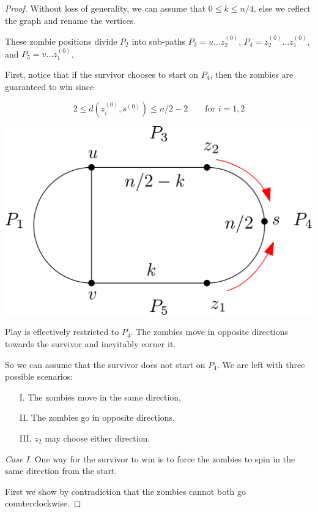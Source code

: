 \documentclass[letterpaper, 10pt]{article}
\begin{document}
\begin{proof}
Without loss of generality, we can assume that $0 \leq k \leq n/4$,
else we reflect the graph and rename the vertices.

These zombie positions divide $P_2$ into sub-paths $P_3 = u \dots z_2^{(0)}$,
$P_4 = z_2^{(0)} \dots z_1^{(0)}$, and
$P_5 = v \dots z_1^{(0)}$.

First, notice that if the survivor chooses to start on $P_4$, then the zombies are guaranteed to win
since

\[ 2 \leq d(z_i^{(0)}, s^{(0)}) \leq n/2 - 2 \qquad \text{for $i = 1,2$} \]

\begin{center}
\includegraphics[scale=0.15]{diagramStartOnP4}
\end{center}

Play is effectively restricted to $P_4$. The zombies
move in opposite directions towards the survivor and inevitably corner it.

So we can assume that the survivor does not start on $P_4$.
We are left with three possible scenarios:

\begin{enumerate}
\item[I.] The zombies move in the same direction,
\item[II.] The zombies go in opposite directions,
\item[III.] $z_2$ may choose either direction.
\end{enumerate}

\emph{Case I.} One way for the survivor to win is to force the zombies to
spin in the same direction from the start.

First we show by contradiction that the zombies cannot both go counterclockwise.


\end{proof}
\end{document}
